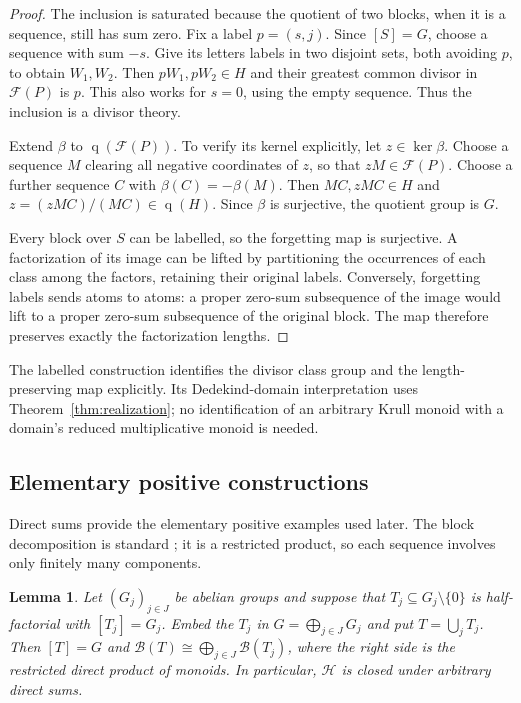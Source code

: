 \documentclass[11pt,reqno]{amsart}
\numberwithin{equation}{section}
\newtheorem{lemma}[theorem]{Lemma}
\theoremstyle{definition}
\theoremstyle{remark}
\newcommand{\HF}{\mathcal H}
\newcommand{\B}{\mathcal B}
\newcommand{\F}{\mathcal F}
\DeclareMathOperator{\q}{q}
\begin{document}
\begin{proof}
The inclusion is saturated because the quotient of two blocks, when
it is a sequence, still has sum zero. Fix a label $p=(s,j)$. Since
$[S]=G$, choose a sequence with sum $-s$. Give its letters labels in
two disjoint sets, both avoiding $p$, to obtain $W_1,W_2$. Then
$pW_1,pW_2\in H$ and their greatest common divisor in $\F(P)$ is
$p$. This also works for $s=0$, using the empty sequence. Thus the
inclusion is a divisor theory.

Extend $\beta$ to $\q(\F(P))$. To verify its kernel explicitly,
let $z\in\ker\beta$. Choose a sequence $M$ clearing all negative
coordinates of $z$, so that $zM\in\F(P)$. Choose a further
sequence $C$ with $\beta(C)=-\beta(M)$. Then $MC,zMC\in H$ and
$z=(zMC)/(MC)\in\q(H)$. Since $\beta$ is surjective, the quotient
group is $G$.

Every block over $S$ can be labelled, so the forgetting map is
surjective. A factorization of its image can be lifted by
partitioning the occurrences of each class among the factors,
retaining their original labels. Conversely, forgetting labels
sends atoms to atoms: a proper zero-sum subsequence of the image
would lift to a proper zero-sum subsequence of the original block.
The map therefore preserves exactly the factorization lengths.
\end{proof}

The labelled construction identifies the divisor class group and the
length-preserving map explicitly. Its Dedekind-domain interpretation
uses Theorem~\ref{thm:realization}; no identification of an arbitrary
Krull monoid with a domain's reduced multiplicative monoid is needed.

\subsection{Elementary positive constructions}

Direct sums provide the elementary positive examples used later.
The block decomposition is standard
\cite[Lemma~3.5]{GeroldingerGoebel}; it is a restricted product,
so each sequence involves only finitely many components.

\begin{lemma}\label{lem:directsums}
Let $(G_j)_{j\in J}$ be abelian groups and suppose that
$T_j\subseteq G_j\setminus\{0\}$ is half-factorial with
$[T_j]=G_j$. Embed the $T_j$ in $G=\bigoplus_{j\in J}G_j$ and
put $T=\bigcup_j T_j$. Then $[T]=G$ and
$\B(T)\cong\bigoplus_{j\in J}\B(T_j)$, where the right side is
the restricted direct product of monoids. In particular,
$\HF$ is closed under arbitrary direct sums.
\end{lemma}
\end{document}
